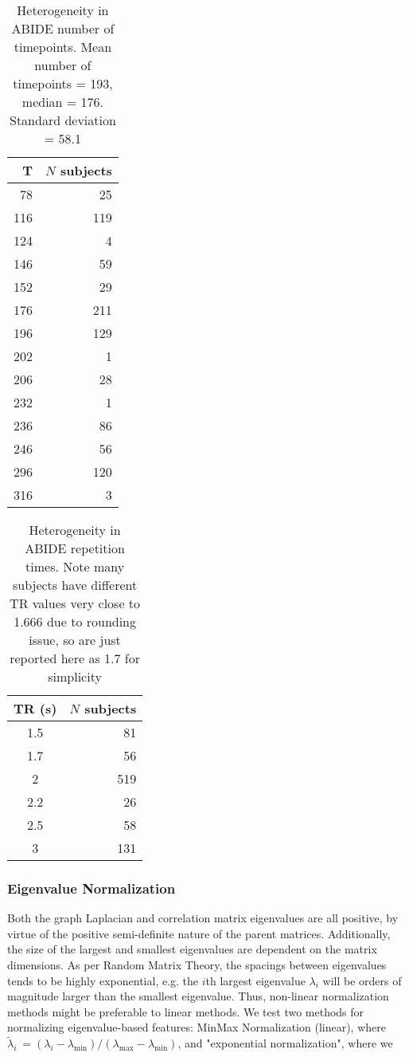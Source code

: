 \documentclass[10pt]{article}
\begin{document}
\begin{table}
  \centering
  \begin{tabular}{rr}
  \toprule
  T &   \(N\) subjects \\
  \midrule
  78  &      25 \\
  116 &     119 \\
  124 &       4 \\
  146 &      59 \\
  152 &      29 \\
  176 &     211 \\
  196 &     129 \\
  202 &       1 \\
  206 &      28 \\
  232 &       1 \\
  236 &      86 \\
  246 &      56 \\
  296 &     120 \\
  316 &       3 \\
  \bottomrule
\end{tabular}\label{tab:timepoints}
\caption{Heterogeneity in ABIDE number of timepoints. Mean number of timepoints = 193, median = 176. Standard deviation = 58.1}
\end{table}

\begin{table}
  \centering
  \begin{tabular}{cr}
  \toprule
  TR (s) &   \(N\) subjects \\
  \midrule
  1.5  &      81 \\
  1.7 &       56 \\
  2    &     519 \\
  2.2  &      26 \\
  2.5  &      58 \\
  3    &     131 \\
  \bottomrule
  \end{tabular}\label{tab:trs}
\caption{Heterogeneity in ABIDE repetition times. Note many subjects have different TR values very close to 1.666 due to rounding issue, so are just reported here as 1.7 for simplicity}
\end{table}

\subsubsection{Eigenvalue Normalization}

Both the graph Laplacian and correlation matrix eigenvalues are all positive, by virtue of the
positive semi-definite nature of the parent matrices. Additionally, the size of the largest and
smallest eigenvalues are dependent on the matrix dimensions. As per Random Matrix Theory, the
spacings between eigenvalues tends to be highly exponential, e.g. the \(i\)th largest eigenvalue
\(\lambda_i\) will be orders of magnitude larger than the smallest eigenvalue. Thus, non-linear
normalization methods might be preferable to linear methods. We test two methods for normalizing
eigenvalue-based features: MinMax Normalization (linear), where \(\tilde{\lambda}_i\ = (\lambda_i -
\lambda_{\text{min}}) / (\lambda_{\text{max}} - \lambda_{\text{min}})\), and "exponential
normalization", where we
\end{document}
